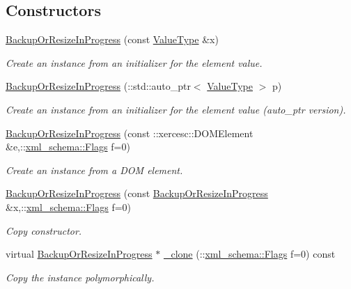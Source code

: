 \subsection*{Constructors}
\begin{DoxyCompactItemize}
\item 
\hyperlink{classopenstack_1_1xml_1_1BackupOrResizeInProgress_acefd3be3615fd2f30bb44d2bdb95dc8b}{BackupOrResizeInProgress} (const \hyperlink{classopenstack_1_1xml_1_1BackupOrResizeInProgressAPIFault}{ValueType} \&x)
\begin{DoxyCompactList}\small\item\em Create an instance from an initializer for the element value. \item\end{DoxyCompactList}\item 
\hyperlink{classopenstack_1_1xml_1_1BackupOrResizeInProgress_a1eb2fc7f8778343b6db2fd6a2ecbda69}{BackupOrResizeInProgress} (::std::auto\_\-ptr$<$ \hyperlink{classopenstack_1_1xml_1_1BackupOrResizeInProgressAPIFault}{ValueType} $>$ p)
\begin{DoxyCompactList}\small\item\em Create an instance from an initializer for the element value (auto\_\-ptr version). \item\end{DoxyCompactList}\item 
\hyperlink{classopenstack_1_1xml_1_1BackupOrResizeInProgress_a83e25a9f3627f77e82be3c59c1e69dd7}{BackupOrResizeInProgress} (const ::xercesc::DOMElement \&e,::\hyperlink{namespacexml__schema_affb4c227cbd9aa7453dd1dc5a1401943}{xml\_\-schema::Flags} f=0)
\begin{DoxyCompactList}\small\item\em Create an instance from a DOM element. \item\end{DoxyCompactList}\item 
\hyperlink{classopenstack_1_1xml_1_1BackupOrResizeInProgress_ac6463398121f160643256503b5bfeda3}{BackupOrResizeInProgress} (const \hyperlink{classopenstack_1_1xml_1_1BackupOrResizeInProgress}{BackupOrResizeInProgress} \&x,::\hyperlink{namespacexml__schema_affb4c227cbd9aa7453dd1dc5a1401943}{xml\_\-schema::Flags} f=0)
\begin{DoxyCompactList}\small\item\em Copy constructor. \item\end{DoxyCompactList}\item 
virtual \hyperlink{classopenstack_1_1xml_1_1BackupOrResizeInProgress}{BackupOrResizeInProgress} $\ast$ \hyperlink{classopenstack_1_1xml_1_1BackupOrResizeInProgress_a6c974b334542a37691822cb16e68eb28}{\_\-clone} (::\hyperlink{namespacexml__schema_affb4c227cbd9aa7453dd1dc5a1401943}{xml\_\-schema::Flags} f=0) const 
\begin{DoxyCompactList}\small\item\em Copy the instance polymorphically. \item\end{DoxyCompactList}\end{DoxyCompactItemize}
